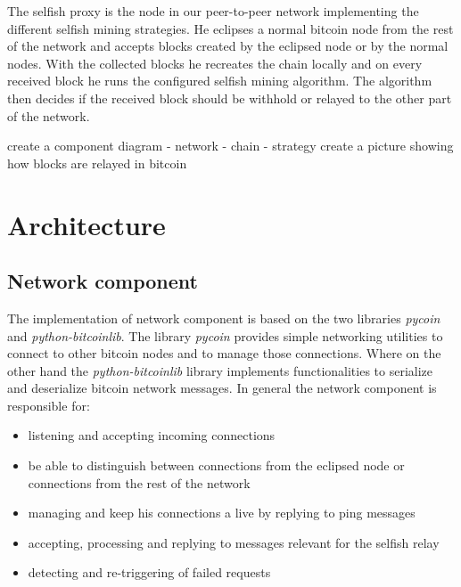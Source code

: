 The selfish proxy is the node in our peer-to-peer network implementing the different selfish mining strategies.
He eclipses a normal bitcoin node from the rest of the network and accepts blocks created by the eclipsed node or by the normal nodes.
With the collected blocks he recreates the chain locally and on every received block he runs the configured selfish mining algorithm.
The algorithm then decides if the received block should be withhold or relayed to the other part of the network.

create a component diagram
 - network
 - chain
 - strategy
create a picture showing how blocks are relayed in bitcoin
 
\section{Architecture}

\subsection{Network component}
The implementation of network component is based on the two libraries \textit{pycoin} and \textit{python-bitcoinlib}.
The library \textit{pycoin} provides simple networking utilities to connect to other bitcoin nodes and to manage those connections. 
Where on the other hand the \textit{python-bitcoinlib} library implements functionalities to serialize and deserialize bitcoin network messages.
In general the network component is responsible for:
\begin{itemize}
 \item listening and accepting incoming connections
 \item be able to distinguish between connections from the eclipsed node or connections from the rest of the network
 \item managing and keep his connections a live by replying to ping messages
 \item accepting, processing and replying to messages relevant for the selfish relay
 \item detecting and re-triggering of failed requests
\end{itemize}

